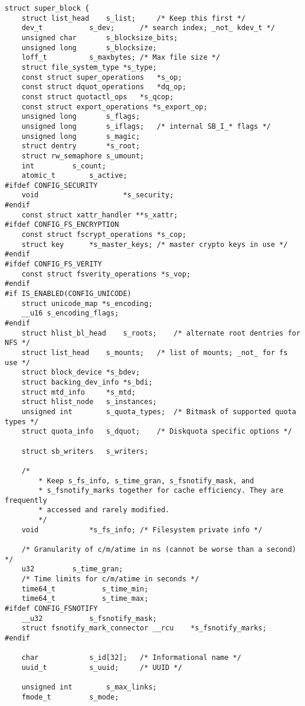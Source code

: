 
\begin{lstlisting}
struct super_block {
    struct list_head	s_list;		/* Keep this first */
    dev_t			s_dev;		/* search index; _not_ kdev_t */
    unsigned char		s_blocksize_bits;
    unsigned long		s_blocksize;
    loff_t			s_maxbytes;	/* Max file size */
    struct file_system_type	*s_type;
    const struct super_operations	*s_op;
    const struct dquot_operations	*dq_op;
    const struct quotactl_ops	*s_qcop;
    const struct export_operations *s_export_op;
    unsigned long		s_flags;
    unsigned long		s_iflags;	/* internal SB_I_* flags */
    unsigned long		s_magic;
    struct dentry		*s_root;
    struct rw_semaphore	s_umount;
    int			s_count;
    atomic_t		s_active;
#ifdef CONFIG_SECURITY
    void                    *s_security;
#endif
    const struct xattr_handler **s_xattr;
#ifdef CONFIG_FS_ENCRYPTION
    const struct fscrypt_operations	*s_cop;
    struct key		*s_master_keys; /* master crypto keys in use */
#endif
#ifdef CONFIG_FS_VERITY
    const struct fsverity_operations *s_vop;
#endif
#if IS_ENABLED(CONFIG_UNICODE)
    struct unicode_map *s_encoding;
    __u16 s_encoding_flags;
#endif
    struct hlist_bl_head	s_roots;	/* alternate root dentries for NFS */
    struct list_head	s_mounts;	/* list of mounts; _not_ for fs use */
    struct block_device	*s_bdev;
    struct backing_dev_info *s_bdi;
    struct mtd_info		*s_mtd;
    struct hlist_node	s_instances;
    unsigned int		s_quota_types;	/* Bitmask of supported quota types */
    struct quota_info	s_dquot;	/* Diskquota specific options */

    struct sb_writers	s_writers;

    /*
        * Keep s_fs_info, s_time_gran, s_fsnotify_mask, and
        * s_fsnotify_marks together for cache efficiency. They are frequently
        * accessed and rarely modified.
        */
    void			*s_fs_info;	/* Filesystem private info */

    /* Granularity of c/m/atime in ns (cannot be worse than a second) */
    u32			s_time_gran;
    /* Time limits for c/m/atime in seconds */
    time64_t		   s_time_min;
    time64_t		   s_time_max;
#ifdef CONFIG_FSNOTIFY
    __u32			s_fsnotify_mask;
    struct fsnotify_mark_connector __rcu	*s_fsnotify_marks;
#endif

    char			s_id[32];	/* Informational name */
    uuid_t			s_uuid;		/* UUID */

    unsigned int		s_max_links;
    fmode_t			s_mode;


\end{lstlisting}
